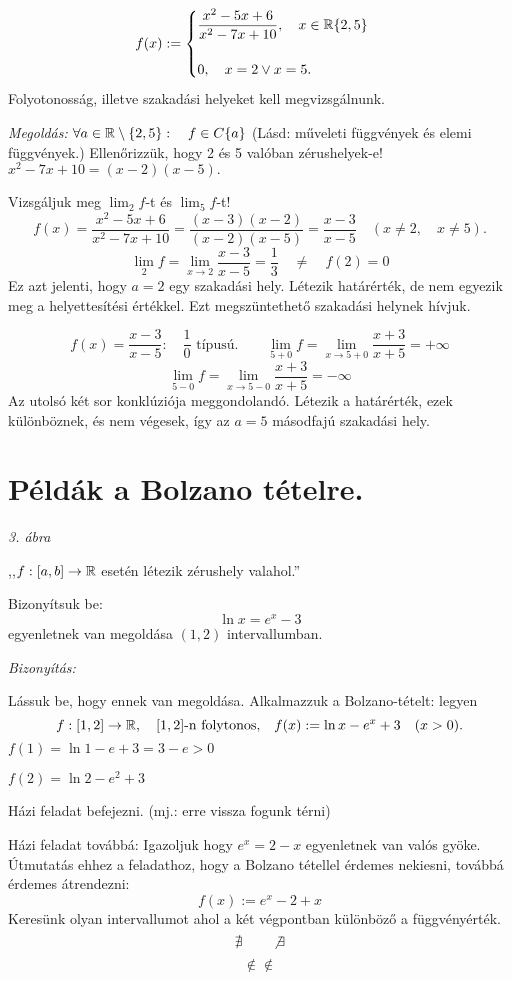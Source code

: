 \documentclass[a4paper,11.5pt]{article}
\begin{document}
	\begin{task}
		\[f(x) :=\begin{cases}
		\displaystyle \frac{x^2-5x+6}{x^2-7x+10},\quad x\in\mathbb{R}\{2,5\}\\
		\\
		0,\quad x=2 \vee x=5.
		\end{cases} \]
		Folyotonosság, illetve szakadási helyeket kell megvizsgálnunk.
		
		\textit{Megoldás:}
		$\forall a\in\mathbb{R}\setminus\{2,5\}:\quad f\in C\{a\}$ (Lásd: műveleti függvények és elemi függvények.)
		Ellenőrizzük, hogy 2 és 5 valóban zérushelyek-e!
		$x^2-7x+10=(x-2)(x-5).$
		
		\medskip
		Vizsgáljuk meg $\displaystyle \lim_2f$-t és $\displaystyle \lim_5f$-t!
		\[ f(x)=\frac{x^2-5x+6}{x^2-7x+10}= \frac{(x-3)(x-2)}{(x-2)(x-5)} =\frac{x-3}{x-5}\quad (x\not=2,\quad x\not=5). \]
		\[ \lim_2f=\lim_{x\to2}\frac{x-3}{x-5}=\frac{1}{3}\quad \not=\quad f(2)=0 \]
		Ez azt jelenti, hogy $a=2$ egy szakadási hely. Létezik határérték, de nem egyezik meg a helyettesítési értékkel. Ezt megszüntethető szakadási helynek hívjuk.
		\medskip
		
		\[ f(x)=\frac{x-3}{x-5}:\quad \frac{1}{0}\text{ típusú.} \quad \quad  \lim_{5+0}f=\lim_{x\to5+0}\frac{x+3}{x+5}=+\infty \]
		\[ \lim_{5-0}f=\lim_{x\to5-0}\frac{x+3}{x+5}=-\infty \]
		Az utolsó két sor konklúziója meggondolandó. Létezik a határérték, ezek különböznek, és nem végesek, így az $a=5$ másodfajú szakadási hely.
	\end{task}
	\section{Példák a Bolzano tételre.}
	
	\textit{3. ábra}
	
	,,$f:[a,b]\to\mathbb{R}$ esetén létezik zérushely valahol.''
	\begin{task}
		Bizonyítsuk be:
		\[ \ln x=e^x-3 \]
		egyenletnek van megoldása $(1,2)$ intervallumban.
		\medskip
		
		\textit{Bizonyítás:}
		
		Lássuk be, hogy ennek van megoldása. Alkalmazzuk a Bolzano-tételt: legyen
		\[ f:[1,2]\to \mathbb{R},\quad [1,2]\text{-n folytonos,}\quad f(x):=\ln x-e^x+3 \quad (x>0).\]
		$f(1)=\ln1-e+3=3-e>0$
		
		$f(2)=\ln2-e^2+3$
		
		Házi feladat befejezni. (mj.: erre vissza fogunk térni)
	\end{task}
	Házi feladat továbbá: Igazoljuk hogy $e^x=2-x$ egyenletnek van valós gyöke. Útmutatás ehhez a feladathoz, hogy a Bolzano tétellel érdemes nekiesni, továbbá érdemes átrendezni:
	\[ f(x):=e^x-2+x \]
	Keresünk olyan intervallumot ahol a két végpontban különböző a függvényérték.
	\[ \nexists\quad \quad \not\exists \]
	\[\not\in\notin \]
\end{document}
